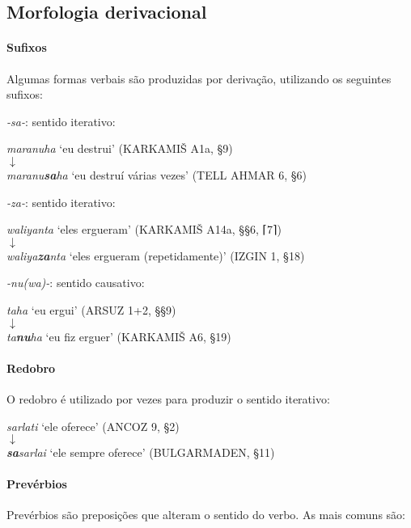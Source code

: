 \subsection{Morfologia derivacional}

\paragraph{Sufixos}
Algumas formas verbais são produzidas por derivação, utilizando os seguintes
sufixos:
\begin{compactenum}[(a)]
	\item \emph{-sa-}: sentido iterativo:
	\begin{center}
		\emph{maranuha} `eu destrui' (KARKAMIŠ A1a, §9)\\
		$\downarrow$\\
		\emph{maranu\textbf{sa}ha} `eu destruí várias vezes' (TELL AHMAR 6, §6)
	\end{center}
	\item \emph{-za-}: sentido iterativo:
	\begin{center}
		\emph{waliyanta} `eles ergueram' (KARKAMIŠ A14a, §§6, \textsc{⌈}7\textsc{⌉})\\
		$\downarrow$\\
		\emph{waliya\textbf{za}nta} `eles ergueram (repetidamente)' (IZGIN 1, §18)
	\end{center}
	\item \emph{-nu{(wa)}-}: sentido causativo:
	\begin{center}
		\emph{taha} `eu ergui' (ARSUZ 1+2, §§9)\\
		$\downarrow$\\
		\emph{ta\textbf{nu}ha} `eu fiz erguer' (KARKAMIŠ A6, §19)
	\end{center}
\end{compactenum}

\paragraph{Redobro}
O redobro é utilizado por vezes para produzir o sentido iterativo:
\begin{center}
	\emph{sarlati} `ele oferece' (ANCOZ 9, §2)\\
	$\downarrow$\\
	\emph{\textbf{sa}sarlai} `ele sempre oferece' (BULGARMADEN, §11)
\end{center}

\paragraph{Prevérbios}
Prevérbios são preposições que alteram o sentido do verbo.
As mais comuns são:

